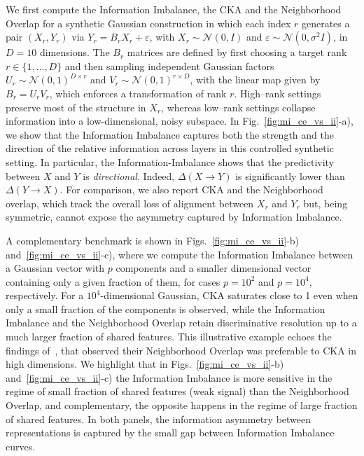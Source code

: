 \documentclass[10pt]{article} %
\begin{document}
We first compute the Information Imbalance, the CKA and the Neighborhood Overlap for a synthetic Gaussian construction in which each index $r$ generates a pair $(X_r, Y_r)$ via $Y_r = B_r X_r + \varepsilon$, with $X_r \sim \mathcal{N}(0, I)$ and $\varepsilon \sim \mathcal{N}(0, \sigma^2 I)$, in $D = 10$ dimensions. The $B_r$ matrices are defined by first choosing a target rank $r \in \{1,\dots,D\}$ and then sampling independent Gaussian factors $U_r \sim \mathcal{N}(0,1)^{D \times r}$ and $V_r \sim \mathcal{N}(0,1)^{r \times D}$, with the linear map given by $B_r = U_r V_r$, which enforces a transformation of rank $r$. High–rank settings preserve most of the structure in $X_r$, whereas low–rank settings collapse information into a low-dimensional, noisy subspace. 
In Fig.~\ref{fig:mi_ce_vs_ii}-a), we show that the Information
Imbalance captures both the strength and the direction of the relative information
across layers in this controlled synthetic setting. 
In particular, the  Information-Imbalance shows that the predictivity between $X$ and $Y$ is \emph{directional}. 
Indeed, $\Delta(X\!\to\!Y)$ is significantly lower than $\Delta(Y\!\to\!X)$. For comparison, we also report CKA and the Neighborhood overlap, which track the overall loss of alignment between $X_r$ and $Y_r$ but, being symmetric, cannot expose the asymmetry captured by Information Imbalance. 

A complementary benchmark is shown in Figs.~\ref{fig:mi_ce_vs_ii}-b) and~\ref{fig:mi_ce_vs_ii}-c), 
where we compute the Information Imbalance between a Gaussian vector with $p$ components and a smaller dimensional vector containing only a given fraction of them, for cases $p = 10^2$ and $p = 10^4$, respectively. 
For a $10^4$-dimensional Gaussian, CKA saturates close to 1 even when only a small fraction of the components is observed, while the Information Imbalance and the Neighborhood Overlap retain discriminative resolution up to a much larger fraction of shared features. 
This illustrative example echoes the findings of~\citet{platonic_hypothesis}, that observed their Neighborhood Overlap was preferable to CKA in high dimensions.
%
We highlight that in Figs.~\ref{fig:mi_ce_vs_ii}-b) and~\ref{fig:mi_ce_vs_ii}-c) the Information Imbalance is more sensitive in the regime of small fraction of shared features (weak signal) than the Neighborhood Overlap, and complementary, the opposite happens in the regime of large fraction of shared features. In both panels, the information asymmetry between representations is captured by the small gap between Information Imbalance curves.
\end{document}
